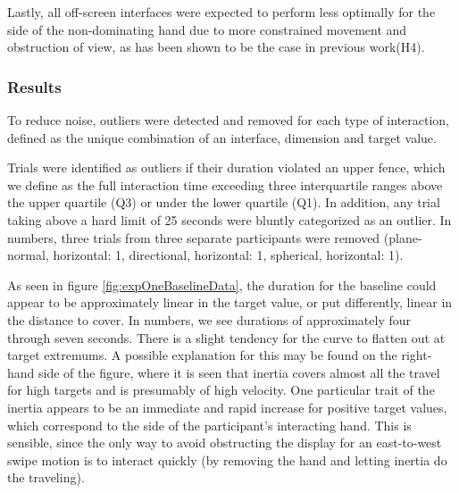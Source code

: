 Lastly, all off-screen interfaces were expected to perform less optimally for the side of the non-dominating hand due to more constrained movement and obstruction of view, as has been shown to be the case in previous work\cite{adbin}(H4).

%
% 

\subsubsection{Results}

To reduce noise, outliers were detected and removed for each type of interaction, defined as the unique combination of an  interface, dimension and target value. 

Trials were identified as outliers if their duration violated an upper fence, which we define as the full interaction time exceeding three interquartile ranges above the upper quartile (Q3) or under the lower quartile (Q1). In addition, any trial taking above a hard limit of 25 seconds were bluntly categorized as an outlier. In numbers, three trials from three separate participants were removed (plane-normal, horizontal: 1, directional, horizontal: 1, spherical, horizontal: 1).





As seen in figure \ref{fig:expOneBaselineData}, the duration for the baseline could appear to be approximately linear in the target value, or put differently, linear in the distance to cover. In numbers, we see durations of approximately four through seven seconds. There is a slight tendency for the curve to  flatten out at target extremums. A  possible explanation for this may be found on the right-hand side of the figure, where it is seen that inertia covers almost all the travel for high targets and is presumably of high velocity. 
One particular trait of the inertia  appears to be an immediate and rapid increase for positive target values, which correspond to the side of the participant's interacting hand. This is sensible, since the only way to avoid obstructing the display for an east-to-west swipe motion is to interact quickly (by removing the hand and letting inertia do the traveling). %


